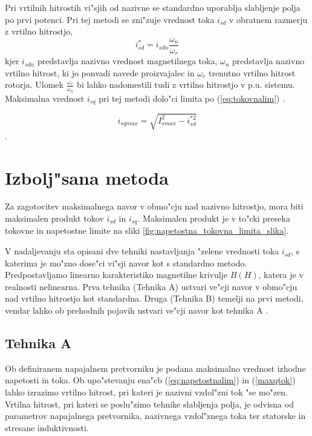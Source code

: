 \documentclass[journal,a4paper,twoside]{sty/IEEEtran}
\begin{document}
Pri vrtilnih hitrostih vi"sjih od nazivne se standardno uporablja slabljenje polja po prvi potenci. Pri tej metodi se zni"zuje vrednost toka $i_{sd}$ v obratnem razmerju z vrtilno hitrostjo,
\begin{equation}
\label{eq:standardna_metoda}
i_{sd}^*=i_{sdn}\frac{\omega_n}{\omega_r}
\end{equation}
kjer $i_{sdn}$ predstavlja nazivno vrednost magnetilnega toka, $\omega_{n}$ predstavlja nazivno vrtilno hitrost, ki jo ponvadi navede proizvajalec in $\omega_{r}$ trenutno vrtilno hitrost rotorja. Ulomek $\frac{\omega_r}{\omega_n}$ bi lahko nadomestili tudi z vrtilno hitrostjo v p.u. sistemu. Maksimalna vrednost $i_{sq}$ pri tej metodi dolo"ci limita po (\ref{eq:tokovnalim}) \cite{vas}.

\begin{equation}
i_{sqmax}=\sqrt{I_{smax}^2-i_{sd}^{*2}}
\label{maxqtok}
\end{equation}.










\section{Izbolj"sana metoda}

Za zagotovitev maksimalnega navor v obmo"cju nad nazivno hitrostjo, mora biti maksimalen produkt tokov $i_{sd}$ in $i_{sq}$. Maksimalen produkt je v to"cki preseka tokovne in napetostne limite na sliki \ref{fig:napetostna_tokovna_limita_slika}.

V nadaljevanju sta opisani dve tehniki nastavljanja "zelene vrednosti toka $i_{sd}$, s katerima je mo"zno dose"ci vi"sji navor kot s standardno metodo. Predpostavljamo linearno karakteristiko magnetilne krivulje $B(H)$, katera je v realnosti nelinearna. Prva tehnika (Tehnika A) ustvari ve"cji navor v obmo"cju nad vrtilno hitrostjo kot standardna. Druga (Tehnika B) temelji na prvi metodi, vendar lahko ob prehodnih pojavih ustvari ve"cji navor kot tehnika A \cite{vas}.

\subsection{Tehnika A}
\label{sec:prva_metoda}


Ob definiranem napajalnem pretvorniku je podana maksimalno vrednost izhodne napetosti in toka. Ob upo"stevanju ena"cb (\ref{eq:napetostnalim}) in (\ref{maxqtok}) lahko izrazimo vrtilno hitrost, pri kateri je nazivni vzdol"zni tok "se mo"zen. Vrtilna hitrost, pri kateri se poslu"zimo tehnike slabljenja polja, je odvisna od parametrov napajalnega pretvornika, nazivnega vzdol"znega toka ter statorske in stresane induktivnosti. 
\end{document}
